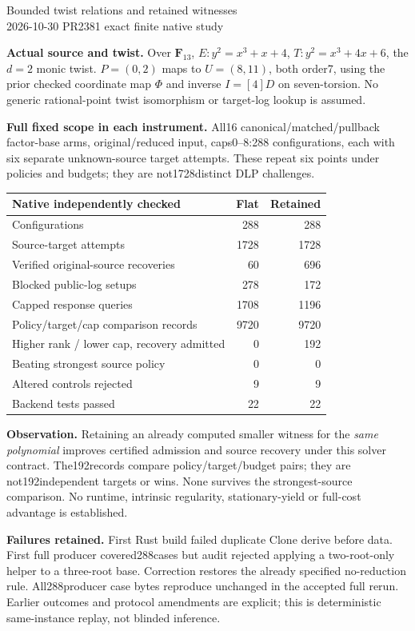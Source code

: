 \documentclass[11pt]{article}
\begin{document}
{\LARGE Bounded twist relations and retained witnesses}\\
2026-10-30 \quad PR2381 \quad exact finite native study

\textbf{Actual source and twist.} Over $\mathbf F_{13}$,
$E:y^2=x^3+x+4$, $T:y^2=x^3+4x+6$, the $d=2$ monic twist.
$P=(0,2)$ maps to $U=(8,11)$, both order7, using the prior checked
coordinate map $\Phi$ and inverse $I=[4]D$ on seven-torsion.
No generic rational-point twist isomorphism or target-log lookup is assumed.

\textbf{Full fixed scope in each instrument.} All16 canonical/matched/pullback
factor-base arms, original/reduced input, caps0--8:288 configurations, each with
six separate unknown-source target attempts. These repeat six points under
policies and budgets; they are not1728distinct DLP challenges.

\begin{center}\begin{tabular}{lrr}\toprule
Native independently checked & Flat & Retained\\\midrule
Configurations &288&288\\
Source-target attempts &1728&1728\\
Verified original-source recoveries &60&696\\
Blocked public-log setups &278&172\\
Capped response queries &1708&1196\\
Policy/target/cap comparison records &9720&9720\\
Higher rank / lower cap, recovery admitted &0&192\\
Beating strongest source policy &0&0\\
Altered controls rejected &9&9\\
Backend tests passed &22&22\\\bottomrule\end{tabular}\end{center}

\textbf{Observation.} Retaining an already computed smaller witness for the
\emph{same polynomial} improves certified admission and source recovery under
this solver contract. The192records compare policy/target/budget pairs; they
are not192independent targets or wins. None survives the strongest-source
comparison. No runtime, intrinsic regularity, stationary-yield or full-cost
advantage is established.

\textbf{Failures retained.} First Rust build failed duplicate Clone derive
before data. First full producer covered288cases but audit rejected applying a
two-root-only helper to a three-root base. Correction restores the already
specified no-reduction rule. All288producer case bytes reproduce unchanged in
the accepted full rerun. Earlier outcomes and protocol amendments are explicit;
this is deterministic same-instance replay, not blinded inference.
\end{document}
